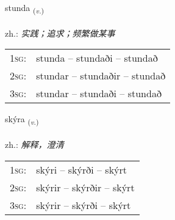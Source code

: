 \documentclass[frontgrid, backgrid]{flacards}\usepackage[]{graphicx}\usepackage[]{xcolor}
\begin{document}
\renewcommand{\flhead}{\vskip5pt \fboxsep=0pt {\small\bfseries\footnotesize Sagnorð | 动词}}
\renewcommand{\fcfoot}{\vskip5pt \fboxsep=0pt \hspace{2pt}{\small\bfseries\footnotesize 1K}}

\renewcommand{\blhead}{\vskip5pt {\small\bfseries\footnotesize Sagnorð | 动词 }}
\renewcommand{\bcfoot}{\vskip5pt \hspace{2pt}{\small\bfseries\footnotesize 1K}}


{stunda \small{\textsubscript{(\textit{v.})}} \\[1ex] %
\textphonetic{[stʏnta]} \\
zh.: \emph{实践；追求；频繁做某事} \\  [2ex]
\renewcommand*{\arraystretch}{0.8}
\begin{tabular}{p{1cm}l}
\textsc{1sg}: & stunda -- stundaði -- stundað \\ 
\textsc{2sg}: & stundar -- stundaðir -- stundað \\ 
\textsc{3sg}: & stundar -- stundaði -- stundað \\ 
\end{tabular}
}

\renewcommand{\flhead}{\vskip5pt \fboxsep=0pt {\small\bfseries\footnotesize Sagnorð | 动词}}
\renewcommand{\fcfoot}{\vskip5pt \fboxsep=0pt \hspace{2pt}{\small\bfseries\footnotesize 1K}}

\renewcommand{\blhead}{\vskip5pt {\small\bfseries\footnotesize Sagnorð | 动词 }}
\renewcommand{\bcfoot}{\vskip5pt \hspace{2pt}{\small\bfseries\footnotesize 1K}}


{skýra \small{\textsubscript{(\textit{v.})}} \\[1ex] %
\textphonetic{[sciːra]} \\
zh.: \emph{解释，澄清} \\  [2ex]
\renewcommand*{\arraystretch}{0.8}
\begin{tabular}{p{1cm}l}
\textsc{1sg}: & skýri -- skýrði -- skýrt \\ 
\textsc{2sg}: & skýrir -- skýrðir -- skýrt \\ 
\textsc{3sg}: & skýrir -- skýrði -- skýrt \\ 
\end{tabular}
}
\end{document}
